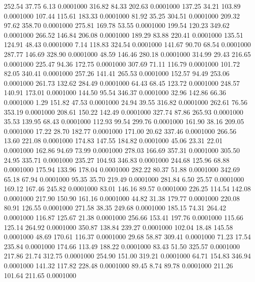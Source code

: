  252.54   37.75    6.13   0.0001000
 316.82   84.33  202.63   0.0001000
 137.25   34.21  103.89   0.0001000
 107.44  115.61  183.33   0.0001000
  81.92   35.25  304.51   0.0001000
 209.32   97.62  358.70   0.0001000
 275.81  169.78   53.55   0.0001000
 199.54  120.23  349.62   0.0001000
 266.52  146.84  206.08   0.0001000
 189.29   83.88  220.41   0.0001000
 135.51  124.91   48.43   0.0001000
   7.14  118.83  324.54   0.0001000
 141.67   90.70   68.54   0.0001000
 287.77  146.69  328.90   0.0001000
  48.59  146.46  280.18   0.0001000
 314.99   29.43  216.65   0.0001000
 225.47   94.36  172.75   0.0001000
 307.69   71.11  116.79   0.0001000
 101.72   82.05  340.41   0.0001000
 257.26  141.41  265.53   0.0001000
 152.57   94.49  253.06   0.0001000
 261.73  132.62  284.49   0.0001000
  64.43   68.45  123.72   0.0001000
 248.57  140.91  173.01   0.0001000
 144.50   95.54  346.37   0.0001000
  32.96  142.86   66.36   0.0001000
   1.29  151.82   47.53   0.0001000
  24.94   39.55  316.82   0.0001000
 262.61   76.56  353.19   0.0001000
 208.61  150.22  142.49   0.0001000
 327.74   87.86  265.93   0.0001000
  35.53  139.95   68.43   0.0001000
 112.93   99.54  299.76   0.0001000
 161.90   38.16  209.05   0.0001000
  17.22   28.70  182.77   0.0001000
 171.00   20.62  337.46   0.0001000
 266.56   13.60  221.08   0.0001000
 174.83  147.55  184.82   0.0001000
  45.06   23.31   22.01   0.0001000
 162.86   94.69   73.99   0.0001000
 278.03  166.69  357.31   0.0001000
 305.50   24.95  335.71   0.0001000
 235.27  104.93  346.83   0.0001000
 244.68  125.96   68.88   0.0001000
 175.94  133.96  178.04   0.0001000
 282.22   80.37   51.88   0.0001000
 342.69   65.18   67.94   0.0001000
  95.35   35.70  219.49   0.0001000
 281.84    6.50   25.57   0.0001000
 169.12  167.46  245.82   0.0001000
  83.01  146.16   89.57   0.0001000
 226.25  114.54  142.08   0.0001000
 217.90  150.90  161.16   0.0001000
  44.82   31.38  179.77   0.0001000
 220.08   80.91  126.55   0.0001000
 271.58   38.35  249.68   0.0001000
 185.15   74.31  264.42   0.0001000
 116.87  125.67   21.38   0.0001000
 256.66  153.41  197.76   0.0001000
 115.66  125.14  264.92   0.0001000
 350.87  138.84  239.27   0.0001000
 102.04   18.48  145.58   0.0001000
  48.69  170.61  116.37   0.0001000
  29.68   58.87  309.41   0.0001000
  71.23   17.54  235.84   0.0001000
 174.66  113.49  188.22   0.0001000
  83.43   51.50  325.57   0.0001000
 217.86   21.74  312.75   0.0001000
 254.90  151.00  319.21   0.0001000
  64.71  154.83  346.94   0.0001000
 141.32  117.82  228.48   0.0001000
  89.45    8.74   89.78   0.0001000
 211.26  101.64  211.65   0.0001000
